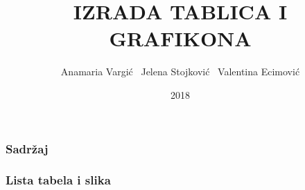 \documentclass[16pt]{beamer}
\title[IZRADA TABLICA I GRAFIKONA\hspace{20mm} \insertframenumber/\inserttotalframenumber]{IZRADA TABLICA I GRAFIKONA}
\author{Anamaria Vargić \  Jelena Stojković  \  Valentina Ecimović}
\institute{Tehnički fakultet u Rijeci - Računarstvo}
\date{2018}
\begin{document}

\frame{\titlepage}
\begin{frame}

\frametitle{Sadržaj}

\tableofcontents

\end{frame}
\begin{frame}
\frametitle{Lista tabela i slika}


\listoffigures
 
\listoftables
 
\newpage
 
\end{frame} 
\end{document}

